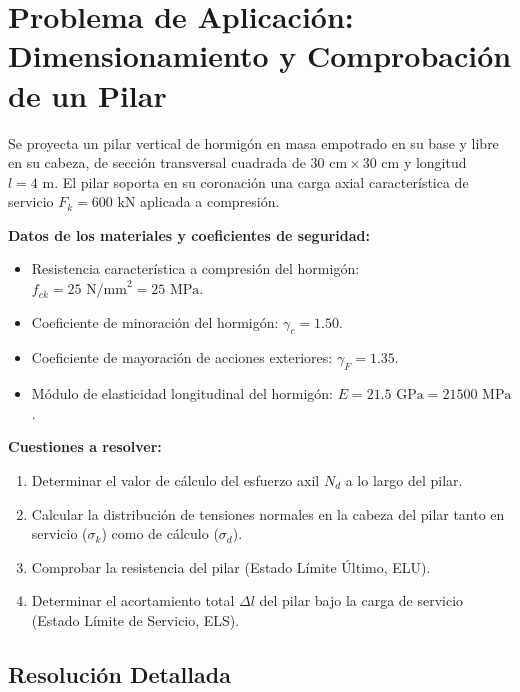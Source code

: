 \section{Problema de Aplicación: Dimensionamiento y Comprobación de un Pilar}

\begin{tcolorbox}[colback=blue!5!white,colframe=blue!75!black,title=\textbf{Problema 6 (Ejemplo de Clase): Pilar de Hormigón en Compresión}]
    Se proyecta un pilar vertical de hormigón en masa empotrado en su base y libre en su cabeza, de sección transversal cuadrada de $30\text{ cm} \times 30\text{ cm}$ y longitud $l = 4\text{ m}$. El pilar soporta en su coronación una carga axial característica de servicio $F_k = 600\text{ kN}$ aplicada a compresión.

    \textbf{Datos de los materiales y coeficientes de seguridad:}
    \begin{itemize}
        \item Resistencia característica a compresión del hormigón: $f_{ck} = 25\text{ N/mm}^2 = 25\text{ MPa}$.
        \item Coeficiente de minoración del hormigón: $\gamma_c = 1.50$.
        \item Coeficiente de mayoración de acciones exteriores: $\gamma_F = 1.35$.
        \item Módulo de elasticidad longitudinal del hormigón: $E = 21.5\text{ GPa} = 21500\text{ MPa}$.
    \end{itemize}

    \textbf{Cuestiones a resolver:}
    \begin{enumerate}[label=\textbf{\Alph*)}]
        \item Determinar el valor de cálculo del esfuerzo axil $N_d$ a lo largo del pilar.
        \item Calcular la distribución de tensiones normales en la cabeza del pilar tanto en servicio ($\sigma_k$) como de cálculo ($\sigma_d$).
        \item Comprobar la resistencia del pilar (Estado Límite Último, ELU).
        \item Determinar el acortamiento total $\Delta l$ del pilar bajo la carga de servicio (Estado Límite de Servicio, ELS).
    \end{enumerate}
\end{tcolorbox}

\subsection*{Resolución Detallada}

